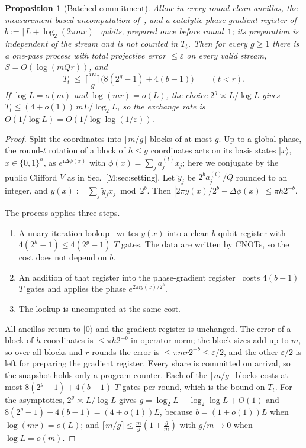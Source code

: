\documentclass[aps,prx,twocolumn,superscriptaddress,nofootinbib,longbibliography]{revtex4-2}
\theoremstyle{plain}
\newtheorem{proposition}{Proposition}
\theoremstyle{definition}
\theoremstyle{remark}
\begin{document}
\begin{proposition}[Batched commitment]\label{prop:batch}
Allow in every round clean ancillas, the measurement-based uncomputation of~\cite{Gidney}, and a catalytic phase-gradient register of $b:=\lceil L+\log_2(2\pi mr)\rceil$ qubits, prepared once before round~$1$; its preparation is independent of the stream and is not counted in $T_t$. Then for every $g\ge1$ there is a one-pass process with total projective error $\le\varepsilon$ on every valid stream, $S=O(\log(mQr))$, and
\[
T_t\ \le\ \Big\lceil\frac mg\Big\rceil\big(8(2^g-1)+4(b-1)\big)\qquad(t<r).
\]
If $\log L=o(m)$ and $\log(mr)=o(L)$, the choice $2^g\asymp L/\log L$ gives $T_t\le(4+o(1))\,mL/\log_2L$, so the exchange rate is $O(1/\log L)=O(1/\log\log(1/\varepsilon))$.
\end{proposition}
\begin{proof}
Split the coordinates into $\lceil m/g\rceil$ blocks of at most $g$. Up to a global phase, the round-$t$ rotation of a block of $h\le g$ coordinates acts on its basis states $|x\rangle$, $x\in\{0,1\}^h$, as $e^{\mathrm i\Delta\phi(x)}$ with $\phi(x)=\sum_{j}a^{(t)}_jx_j$; here we conjugate by the public Clifford $V$ as in Sec.~\ref{M:sec:setting}. Let $\tilde y_j$ be $2^ba^{(t)}_j/Q$ rounded to an integer, and $y(x):=\sum_j\tilde y_jx_j\bmod2^b$. Then $|2\pi y(x)/2^b-\Delta\phi(x)|\le\pi h2^{-b}$.

The process applies three steps.
\begin{enumerate}\setlength\itemsep{0pt}
\item A unary-iteration lookup~\cite{Babbush} writes $y(x)$ into a clean $b$-qubit register with $4(2^h-1)\le4(2^g-1)$ $T$ gates. The data are written by CNOTs, so the cost does not depend on $b$.
\item An addition of that register into the phase-gradient register~\cite{Gidney} costs $4(b-1)$ $T$ gates and applies the phase $e^{2\pi\mathrm iy(x)/2^b}$.
\item The lookup is uncomputed at the same cost.
\end{enumerate}
All ancillas return to $|0\rangle$ and the gradient register is unchanged. The error of a block of $h$ coordinates is $\le\pi h2^{-b}$ in operator norm; the block sizes add up to $m$, so over all blocks and $r$ rounds the error is $\le\pi mr2^{-b}\le\varepsilon/2$, and the other $\varepsilon/2$ is left for preparing the gradient register. Every share is committed on arrival, so the snapshot holds only a program counter. Each of the $\lceil m/g\rceil$ blocks costs at most $8(2^g-1)+4(b-1)$ $T$ gates per round, which is the bound on $T_t$. For the asymptotics, $2^g\asymp L/\log L$ gives $g=\log_2L-\log_2\log L+O(1)$ and $8(2^g-1)+4(b-1)=(4+o(1))L$, because $b=(1+o(1))L$ when $\log(mr)=o(L)$; and $\lceil m/g\rceil\le\frac mg(1+\frac gm)$ with $g/m\to0$ when $\log L=o(m)$.
\end{proof}
\end{document}
